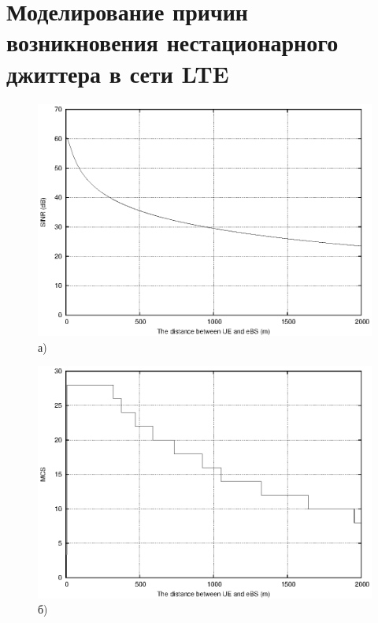 \documentclass[10pt,pdf,hyperref={unicode}]{beamer}
\begin{document}
\section{Моделирование причин возникновения нестационарного джиттера в сети LTE}
\begin{figure} [!h]
{\fontscript\begin{footnotesize}
\begin{minipage}[h]{0.47\linewidth}
\center
\includegraphics[width=1\linewidth]{Sinr_dist.eps} а) \\
\end{minipage}
\hfill
\begin{minipage}[h]{0.47\linewidth}
\center
\includegraphics[width=1\linewidth]{mcs_dist.eps} б) \\
\end{minipage}
\vfill
\begin{minipage}[h]{0.47\linewidth}

\end{minipage}
\end{footnotesize}}
\end{figure}
\end{document}
